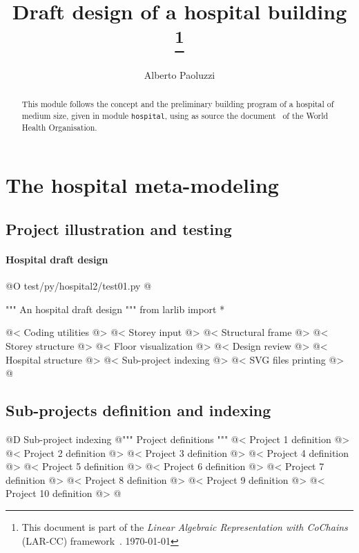 \documentclass[11pt,oneside]{article}    %
\title{Draft design of a hospital building
\footnote{This document is part of the \emph{Linear Algebraic Representation with CoChains} (LAR-CC) framework~\cite{cclar-proj:2013:00}. \today}
}
\author{Alberto Paoluzzi}
\begin{document}
\maketitle
\tableofcontents

\begin{abstract}
This module follows the concept and the preliminary building program of a hospital of medium size, given in module \texttt{hospital}, using as source the document~\cite{who:2013} of the World Health Organisation. 
\end{abstract}


\section{The  hospital meta-modeling}

\subsection{Project illustration and testing}

\paragraph{Hospital draft design}
@O test/py/hospital2/test01.py
@{""" An hospital draft design """
from larlib import *
    
@< Coding utilities @>
@< Storey input @>
@< Structural frame @>
@< Storey structure @>
@< Floor visualization @>
@< Design review @>
@< Hospital structure @>
@< Sub-project indexing @>
@< SVG files printing @>
@}

\subsection{Sub-projects definition and indexing}

@D Sub-project indexing
@{""" Project definitions """
@< Project 1 definition @>
@< Project 2 definition @>
@< Project 3 definition @>
@< Project 4 definition @>
@< Project 5 definition @>
@< Project 6 definition @>
@< Project 7 definition @>
@< Project 8 definition @>
@< Project 9 definition @>
@< Project 10 definition @>
@}
\end{document}
